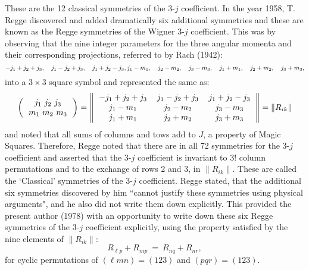 These are the 12 classical symmetries of the 3-$j$ coefficient. 
In the year 1958, T. Regge discovered and added dramatically six additional
symmetries and these are known as the Regge symmetries of the Wigner 3-$j$ coefficient.
This was by observing that the nine integer parameters for the three angular momenta and
their corresponding projections, referred to by Rach (1942):
\begin{equation}
-j_1+j_2+j_3, \quad  j_1-j_2+j_3, \quad j_1+j_2-j_3,\\
j_1-m_1,\quad j_2-m_2,\quad j_3-m_3,\quad j_1+m_1,\quad j_2+m_2,\quad j_3+m_3,\label{chap29-eq10}
\end{equation}
into a $3\times 3$ square symbol and represented the same as:
\begin{equation}
\left(
\begin{tabular}{ccc}
$j_1\ j_2\ j_3$\\ 
$m_1\ m_2\ m_3$\\ 
\end{tabular} 
\right) 
= \left\| 
\begin{tabular}{ccc}
$-j_1+j_2+j_3$ & $j_1-j_2+j_3$ &  $j_1+j_2-j_3$\\
$j_1-m_1$ & $j_2-m_2$ & $j_3-m_3$\\
$j_1+m_1$ & $j_2+m_2$ & $j_3+m_3$\\
\end{tabular} 
\right\|
=\|R_{ik}\| \label{chap29-eq11}
\end{equation}
and noted that all sums of columns and tows add to $J$, a property of Magic Squares. 
Therefore, Regge noted that there are in all 72 symmetries for the 3-$j$ coefficient
and asserted that the 3-$j$ coefficient is invariant to 3! column permutations and to
the exchange of rows 2 and 3, in $\|R_{ik}\|$. These are called the `Classical' 
symmetries of the 3-$j$ coefficient. Regge stated, that the additional six symmetries
discovered by him ``cannot justify these symmetries using physical arguments", and he 
also did not write them down explicitly. This provided the present author (1978) 
with an opportunity to write down these six Regge symmetries of the 3-$j$ coefficient 
explicitly, using the property satisfied by the nine elements of $\|R_{ik}\|$:
\begin{equation}
R_{\ell p} + R_{mp}\ =\ R_{nq} + R_{nr},\label{chap29-eq12}
\end{equation}
for cyclic permutations of $(\ell mn)=(123)$ and $(pqr)=(123)$. 

